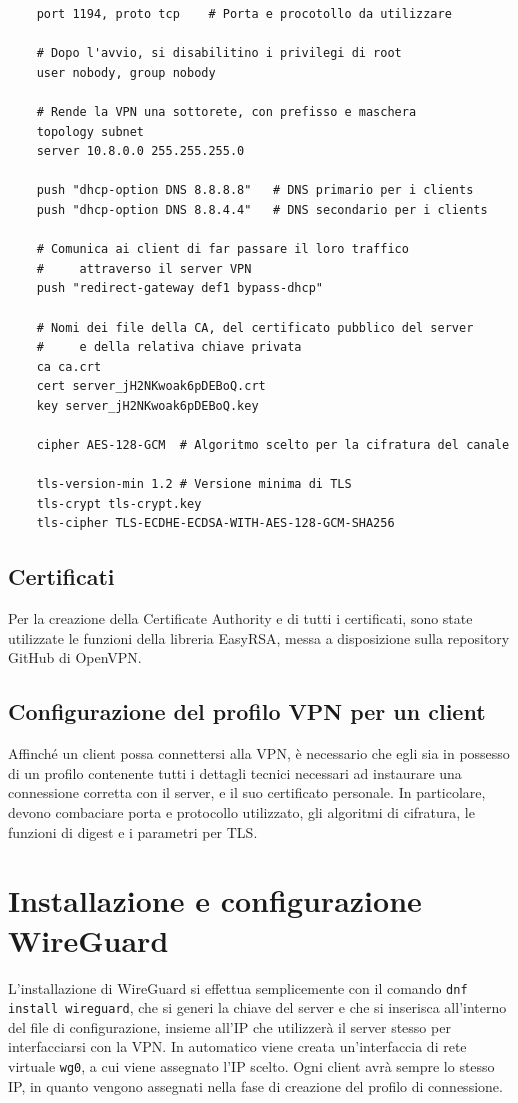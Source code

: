 \begin{verbatim}
    port 1194, proto tcp    # Porta e procotollo da utilizzare
    
    # Dopo l'avvio, si disabilitino i privilegi di root
    user nobody, group nobody   

    # Rende la VPN una sottorete, con prefisso e maschera
    topology subnet         
    server 10.8.0.0 255.255.255.0

    push "dhcp-option DNS 8.8.8.8"   # DNS primario per i clients
    push "dhcp-option DNS 8.8.4.4"   # DNS secondario per i clients

    # Comunica ai client di far passare il loro traffico 
    #     attraverso il server VPN
    push "redirect-gateway def1 bypass-dhcp"   

    # Nomi dei file della CA, del certificato pubblico del server 
    #     e della relativa chiave privata
    ca ca.crt
    cert server_jH2NKwoak6pDEBoQ.crt
    key server_jH2NKwoak6pDEBoQ.key
    
    cipher AES-128-GCM  # Algoritmo scelto per la cifratura del canale

    tls-version-min 1.2 # Versione minima di TLS
    tls-crypt tls-crypt.key
    tls-cipher TLS-ECDHE-ECDSA-WITH-AES-128-GCM-SHA256  
\end{verbatim}

\subsection{Certificati}
Per la creazione della Certificate Authority e di tutti i certificati, sono state utilizzate le funzioni della libreria EasyRSA, messa a disposizione sulla repository GitHub di OpenVPN.

\subsection{Configurazione del profilo VPN per un client}
Affinché un client possa connettersi alla VPN, è necessario che egli sia in possesso di un profilo contenente tutti i dettagli tecnici necessari ad instaurare una connessione corretta con il server, e il suo certificato personale. In particolare, devono combaciare porta e protocollo utilizzato, gli algoritmi di cifratura, le funzioni di digest e i parametri per TLS.

\section{Installazione e configurazione WireGuard}
L'installazione di WireGuard si effettua semplicemente con il comando \texttt{dnf install wireguard}, che si generi la chiave del server e che si inserisca all'interno del file di configurazione, insieme all'IP che utilizzerà il server stesso per interfacciarsi con la VPN. In automatico viene creata un'interfaccia di rete virtuale \texttt{wg0}, a cui viene assegnato l'IP scelto. 
Ogni client avrà sempre lo stesso IP, in quanto vengono assegnati nella fase di creazione del profilo di connessione.

